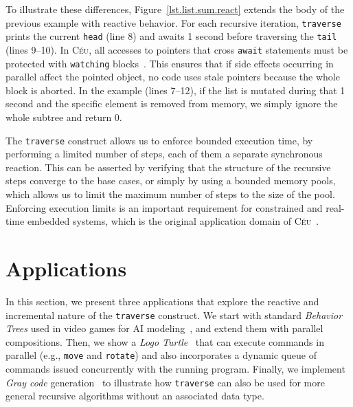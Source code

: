 \documentclass{sig-alternate}
\newcommand{\CEU}{\textsc{C\'{e}u}\xspace}
\newcommand{\code}[1] {{\small{\texttt{#1}}}}
\begin{document}
To illustrate these differences, Figure~\ref{lst.list.sum.react} extends the body
of the previous example with reactive behavior.
For each recursive iteration, \code{traverse} prints the current 
\code{head} (line 8) and awaits 1 second before traversing the \code{tail} 
(lines 9--10).
In \CEU, all accesses to pointers that cross \code{await} statements must be 
protected with \code{watching} blocks~\cite{ceu.mod15}.
This ensures that if side effects occurring in parallel affect the pointed 
object, no code uses stale pointers because the whole block is aborted.
In the example (lines 7--12), if the list is mutated during that 1 second and 
the specific element is removed from memory, we simply ignore the whole subtree 
and return 0.

The \code{traverse} construct allows us to enforce bounded execution time, by
performing a limited number of steps, each of them a separate synchronous
reaction. This can be asserted by verifying that the structure of the
recursive steps converge to the base cases, or simply by using a bounded
memory pools, which allows us to limit the maximum number of steps to the size
of the pool. Enforcing execution limits is an important requirement for
constrained and real-time embedded systems, which is the original application
domain of \CEU~\cite{ceu.sensys13}.

\section{Applications}

In this section, we present three applications that explore the reactive and 
incremental nature of the \code{traverse} construct.
We start with standard \emph{Behavior Trees} used in video games for AI 
modeling~\cite{TODO}, and extend them with parallel compositions.
Then, we show a \emph{Logo Turtle}~\cite{TODO} that can execute commands in 
parallel (e.g., \code{move} and \code{rotate}) and also incorporates a dynamic 
queue of commands issued concurrently with the running program.
Finally, we implement \emph{Gray code} generation~\cite{TODO} to illustrate how 
\code{traverse} can also be used for more general recursive algorithms without 
an associated data type.
\end{document}
